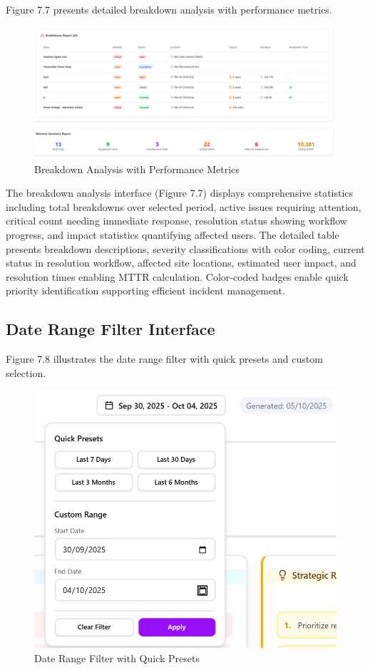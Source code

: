 Figure 7.7 presents detailed breakdown analysis with performance metrics.

\begin{figure}[H]
    \centering
    \includegraphics[width=0.9\linewidth]{img/chap_07/screenshot_breakdown_analysis.png}
    \caption{Breakdown Analysis with Performance Metrics}
    \label{fig:breakdown_analysis}
\end{figure}

The breakdown analysis interface (Figure 7.7) displays comprehensive statistics including total breakdowns over selected period, active issues requiring attention, critical count needing immediate response, resolution status showing workflow progress, and impact statistics quantifying affected users. The detailed table presents breakdown descriptions, severity classifications with color coding, current status in resolution workflow, affected site locations, estimated user impact, and resolution times enabling MTTR calculation. Color-coded badges enable quick priority identification supporting efficient incident management.

\subsection{Date Range Filter Interface}

Figure 7.8 illustrates the date range filter with quick presets and custom selection.

\begin{figure}[H]
    \centering
    \includegraphics[width=0.7\linewidth]{img/chap_07/screenshot_date_filter..png}
    \caption{Date Range Filter with Quick Presets}
    \label{fig:date_filter}
\end{figure}

